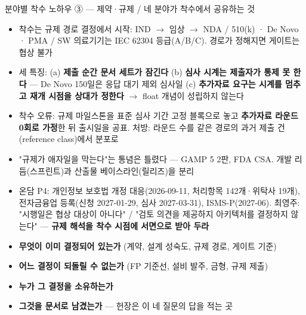 \begin{frame}[allowframebreaks=1.0]{분야별 착수 노하우 ③ — 제약·규제 / 네 분야가 착수에서 공유하는 것}
\small
\par\smallskip{}\nobreak
\begin{itemize}
\item\relax 착수는 규제 경로 결정에서 시작: IND $\rightarrow$ 임상 $\rightarrow$ NDA / 510(k) · De Novo · PMA / SW 의료기기는 IEC 62304 등급(A/B/C). 경로가 정해지면 게이트는 협상 불가
\item\relax 세 특징: (a) \textbf{제출 순간 문서 세트가 잠긴다} (b) \textbf{심사 시계는 제출자가 통제 못 한다} — De Novo 150일은 응답 대기 제외 심사일 (c) \textbf{추가자료 요구는 시계를 멈추고 재개 시점을 상대가 정한다} $\rightarrow$ float 개념이 성립하지 않는다
\item\relax 착수 오류: 규제 마일스톤을 표준 심사 기간 고정 블록으로 놓고 \textbf{추가자료 라운드 0회로 가정}한 뒤 출시일을 공표. 처방: 라운드 수를 같은 경로의 과거 제출 건(reference class)에서 분포로
\item\relax "규제가 애자일을 막는다"는 통념은 틀렸다 — GAMP 5 2판, FDA CSA. 개발 리듬(스프린트)과 산출물 베이스라인(릴리즈)을 분리
\item\relax 온담 P4: 개인정보 보호법 개정 대응(2026-09-11, 처리항목 142개·위탁사 19개), 전자금융업 등록(신청 2027-01-29, 심사 2027-03-31), ISMS-P(2027-06). 최영주: "시행일은 협상 대상이 아니다" / "검토 의견을 제공하지 아키텍처를 결정하지 않는다" — \textbf{규제 해석을 착수 시점에 서면으로 받아 두라}
\end{itemize}
\par\smallskip{}\nobreak
\begin{itemize}
\item\relax \textbf{무엇이 이미 결정되어 있는가} (계약, 설계 성숙도, 규제 경로, 게이트 기준)
\item\relax \textbf{어느 결정이 되돌릴 수 없는가} (FP 기준선, 설비 발주, 금형, 규제 제출)
\item\relax \textbf{누가 그 결정을 소유하는가}
\item\relax \textbf{그것을 문서로 남겼는가} — 헌장은 이 네 질문의 답을 적는 곳
\end{itemize}
\end{frame}

